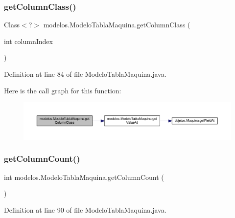 \subsubsection{\texorpdfstring{get\+Column\+Class()}{getColumnClass()}}
{\footnotesize\ttfamily Class$<$?$>$ modelos.\+Modelo\+Tabla\+Maquina.\+get\+Column\+Class (\begin{DoxyParamCaption}\item[{int}]{column\+Index }\end{DoxyParamCaption})}



Definition at line 84 of file Modelo\+Tabla\+Maquina.\+java.

Here is the call graph for this function\+:
\nopagebreak
\begin{figure}[H]
\begin{center}
\leavevmode
\includegraphics[width=350pt]{classmodelos_1_1_modelo_tabla_maquina_a29f3df9756e2a5e9a66bde094a1ee56e_cgraph}
\end{center}
\end{figure}
\mbox{\label{classmodelos_1_1_modelo_tabla_maquina_a83f4d721197d932523e11de1155cbad6}} 
\subsubsection{\texorpdfstring{get\+Column\+Count()}{getColumnCount()}}
{\footnotesize\ttfamily int modelos.\+Modelo\+Tabla\+Maquina.\+get\+Column\+Count (\begin{DoxyParamCaption}{ }\end{DoxyParamCaption})}



Definition at line 90 of file Modelo\+Tabla\+Maquina.\+java.

\mbox{\label{classmodelos_1_1_modelo_tabla_maquina_a557771e167f337141e22d3d4a0432b7b}} 
